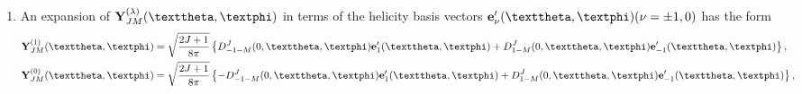 \begin{enumerate}[label=(\alph*)]
\begin{align}
\left[\vect{Y}_{J M}^{J+1}(\vartheta, \varphi)\right]^{\prime-1}&=-\left[\vect{Y}_{J M}^{J+1}(\vartheta, \varphi)\right]_{+1}^{\prime}=\sqrt{\frac{J}{8 \pi}} D_{1-M}^{J}(0, \vartheta, \varphi), \notag
\end{align}
\begin{align}
\left[\vect{Y}_{J M}^{J}(\vartheta, \varphi)\right]^{\prime+1}&=-\left[\vect{Y}_{J M}^{J}(\vartheta, \varphi)\right]_{-1}^{\prime}=-\sqrt{\frac{2 J+1}{8 \pi}} D_{-1-M}^{J}(0, \vartheta, \varphi), \notag\\
\left[\vect{Y}_{J M}^{J}(\vartheta, \varphi)\right]^{\prime 0}&=\left[\vect{Y}_{J M}^{J}(\vartheta, \varphi)\right]_{0}^{\prime}=0, \label{eq:7:3:33}\\
\left[\vect{Y}_{J M}^{J}(\vartheta, \varphi)\right]^{\prime-1}&=-\left[\vect{Y}_{J M}^{J}(\vartheta, \varphi)\right]_{+1}^{\prime}=\sqrt{\frac{2 J+1}{8 \pi}} D_{1-M}^{J}(0, \vartheta, \varphi). \notag
\end{align}
\begin{align}
\left[\vect{Y}_{J M}^{J-1}(\vartheta, \varphi)\right]^{\prime+1} & =-\left[\vect{Y}_{J M}^{J-1}(\vartheta, \varphi)\right]_{-1}^{\prime}=\sqrt{\frac{J+1}{8 \pi}} D_{-1-M}^{J}(0, \vartheta, \varphi), \notag\\
{\left[\vect{Y}_{J M}^{J-1}(\vartheta, \varphi)\right]^{\prime 0} } & =\left[\vect{Y}_{J M}^{J-1}(\vartheta, \varphi)\right]_{0}^{\prime}=\sqrt{\frac{J}{4 \pi}} D_{0-M}^{J}(0, \vartheta, \varphi), \label{eq:7:3:34}\\
{\left[\vect{Y}_{J M}^{J-1}(\vartheta, \varphi)^{\prime-1}\right.} & =-\left[\vect{Y}_{J M}^{J-1}(\vartheta, \varphi)\right]_{+1}^{\prime}=\sqrt{\frac{J+1}{8 \pi}} D_{1-M}^{J}(0, \vartheta, \varphi). \notag
\end{align}
\item An expansion of $\vect{Y}_{J M}^{(\lambda)}(\vartheta, \varphi)$ in terms of the helicity basis vectors $\vect{e}_{\nu}^{\prime}(\vartheta, \varphi)(\nu= \pm 1,0)$ has the form
\begin{align}
\vect{Y}_{J M}^{(1)}(\vartheta, \varphi) & =\sqrt{\frac{2 J+1}{8 \pi}}\left\{D_{-1-M}^{J}(0, \vartheta, \varphi) \vect{e}_{1}^{\prime}(\vartheta, \varphi)+D_{1-M}^{J}(0, \vartheta, \varphi) \vect{e}_{-1}^{\prime}(\vartheta, \varphi)\right\}, \notag\\
\vect{Y}_{J M}^{(0)}(\vartheta, \varphi) & =\sqrt{\frac{2 J+1}{8 \pi}}\left\{-D_{-1-M}^{J}(0, \vartheta, \varphi) \vect{e}_{1}^{\prime}(\vartheta, \varphi)+D_{1-M}^{J}(0, \vartheta, \varphi) \vect{e}_{-1}^{\prime}(\vartheta, \varphi)\right\}, \label{eq:7:3:35}\\

\end{align}
\end{enumerate}
